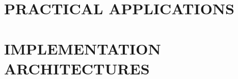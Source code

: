 \documentclass[12pt,letterpaper]{article}
\begin{document}
% 
% 
% 
%
%
%
%
%

\section*{PRACTICAL APPLICATIONS}

%
%
%
%
%
%

\section*{IMPLEMENTATION ARCHITECTURES}
\end{document}
